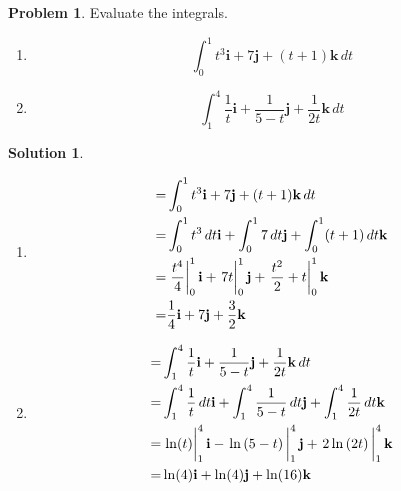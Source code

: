 \documentclass[10pt]{article}
\theoremstyle{definition}
\newtheorem{problem}{Problem}
\newtheorem{soln}{Solution}
\begin{document}
\begin{problem} Evaluate the integrals.
\begin{enumerate}[label=(\alph*)]
  \item $$\int_{0}^{1} t^3\mathbf{i}+7\mathbf{j}+(t+1)\mathbf{k} \,dt$$
  \item $$\int_{1}^{4} \frac{1}{t}\mathbf{i}+\frac{1}{5-t}\mathbf{j}+\frac{1}{2t}\mathbf{k} \,dt$$
\end{enumerate}
\end{problem}
\begin{soln}~
  \begin{enumerate}[label=(\alph*)]
    \item \begin{align*}
            = & \int_{0}^{1} t^3\mathbf{i}+7\mathbf{j}+(t+1)\mathbf{k} \,dt                                                 \\
            = & \int_{0}^{1} t^3\,dt\mathbf{i}+\int_{0}^{1}7\,dt\mathbf{j}+\int_{0}^{1}(t+1)\,dt\mathbf{k}                  \\
            = & \eval{\frac{t^4}{4}}_{0}^{1}\mathbf{i}+\eval{7t}_{0}^{1}\mathbf{j}+\eval{\frac{t^2}{2}+t}_{0}^{1}\mathbf{k} \\
            = & \frac{1}{4}\mathbf{i}+7\mathbf{j}+\frac{3}{2}\mathbf{k}
          \end{align*}
    \item \begin{align*}
            = & \int_{1}^{4} \frac{1}{t}\mathbf{i}+\frac{1}{5-t}\mathbf{j}+\frac{1}{2t}\mathbf{k} \,dt                                    \\
            = & \int_{1}^{4} \frac{1}{t}\,dt\mathbf{i}+\int_{1}^{4} \frac{1}{5-t}\,dt\mathbf{j}+\int_{1}^{4} \frac{1}{2t}\,dt\mathbf{k}   \\
            = & \eval{\ln(t)}_{1}^{4}\mathbf{i}-\eval{\ln\left(5-t\right)}_{1}^{4}\mathbf{j}+\eval{2\ln\left(2t\right)}_{1}^{4}\mathbf{k} \\
            = & \ln(4)\mathbf{i}+\ln(4)\mathbf{j}+\ln(16)\mathbf{k}
          \end{align*}
  \end{enumerate}
\end{soln}
\end{document}
